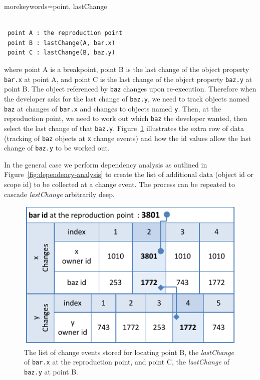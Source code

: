 \documentclass{sig-alternate}
\begin{document}
{morekeywords={point, lastChange}}

\lstset{basicstyle=\small}
\begin{lstlisting}[frame=single, language=myLang2] %, framerule=0pt]

 point A : the reproduction point 
 point B : lastChange(A, bar.x) 
 point C : lastChange(B, baz.y) 
\end{lstlisting}


where point A is a breakpoint, point B is the last change of the object property \texttt{bar.x} at point A, and
point C is the last change of the object property \texttt{baz.y} at point B. 
The object referenced by \texttt{baz} changes upon re-execution. Therefore when the developer
asks for the last change of \texttt{baz.y}, we need to track objects named \texttt{baz}
at changes of \texttt{bar.x} and changes to objects named \texttt{y}. Then, at the reproduction point,
we need to work out which \texttt{baz} the developer wanted, then select the last change of that \texttt{baz.y}.
Figure~\ref{fig:lastchange-lastchange} illustrates the extra row of data (tracking of \texttt{baz} objects 
at \texttt{x} change events) 
and how the id values allow the last change of \texttt{baz.y} to be worked out. 
 
In the general case we perform dependency analysis as outlined in 
Figure~\ref{fig:dependency-analysis} to
create the list of additional data (object id or scope id) to be collected at a change
event. The process can be repeated to cascade \textit{lastChange} arbitrarily deep.


\begin{figure}[htp]
\centering 
\includegraphics[width=.48\textwidth]{8-lastchange-lastchange.pdf}
\caption{The list of change events stored for locating point B, the
  \textit{lastChange} of \texttt{bar.x} at the reproduction point, and
  point C, the \textit{lastChange} of \texttt{baz.y} at point B.}
\label{fig:lastchange-lastchange}
\end{figure}
\end{document}
